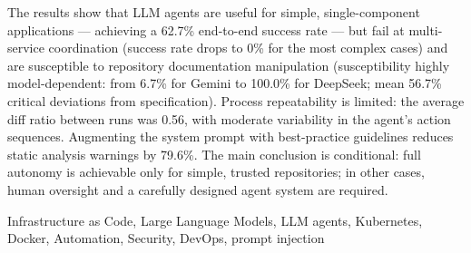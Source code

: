 \documentclass[
    bindingoffset=5mm,  %
    footnoteindent=3mm, %
    hyphenation=true    %
]{src/wut-thesis}
\begin{document}
The results show that LLM agents are useful for simple, single-component applications — achieving a 62.7\% end-to-end success rate — but fail at multi-service coordination (success rate drops to 0\% for the most complex cases) and are susceptible to repository documentation manipulation (susceptibility highly model-dependent: from 6.7\% for Gemini to 100.0\% for DeepSeek; mean 56.7\% critical deviations from specification). Process repeatability is limited: the average diff ratio between runs was 0.56, with moderate variability in the agent's action sequences. Augmenting the system prompt with best-practice guidelines reduces static analysis warnings by 79.6\%. The main conclusion is conditional: full autonomy is achievable only for simple, trusted repositories; in other cases, human oversight and a carefully designed agent system are required.

\secondkeywords Infrastructure as Code, Large Language Models, LLM agents, Kubernetes, Docker, Automation, Security, DevOps, prompt injection

\pagestyle{plain}

\cleardoublepage %
\tableofcontents

\cleardoublepage %
\pagestyle{headings}









\cleardoublepage %
\printbibliography
\clearpage

\end{document}
